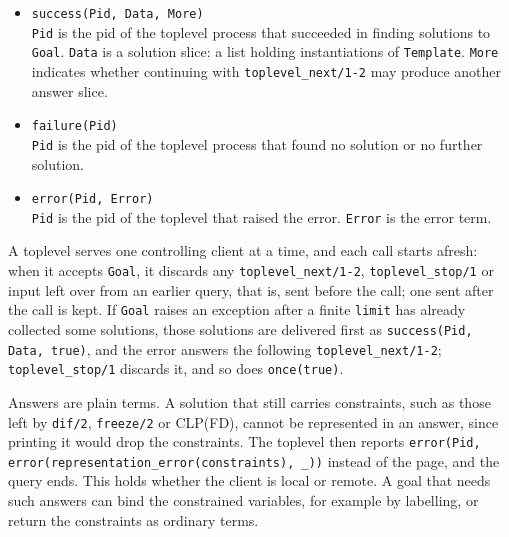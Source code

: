 \begin{itemize}
\item
  \texttt{success(\allowbreak{}Pid,\allowbreak{} Data,\allowbreak{} More)}\\
  \texttt{Pid} is the pid of the toplevel process that succeeded in finding
  solutions to \texttt{Goal}. \texttt{Data} is a solution slice: a list holding
  instantiations of \texttt{Template}. \texttt{More} indicates whether
  continuing with \texttt{toplevel\_\allowbreak{}next/\allowbreak{}1-2} may produce another answer
  slice.
\item
  \texttt{failure(\allowbreak{}Pid)}\\
  \texttt{Pid} is the pid of the toplevel process that found no solution or
  no further solution.
\item
    \texttt{error(\allowbreak{}Pid,\allowbreak{} Error)}\\
  \texttt{Pid} is the pid of the toplevel that raised the error.
  \texttt{Error} is the error term.
\end{itemize}

\noindent A toplevel serves one controlling client at a time, and each call
starts afresh: when it accepts \texttt{Goal}, it discards any
\texttt{toplevel\_\allowbreak{}next/\allowbreak{}1-2}, \texttt{toplevel\_\allowbreak{}stop/\allowbreak{}1} or input left over
from an earlier query, that is, sent before the call; one sent after the call
is kept. If \texttt{Goal} raises an exception after a finite
\texttt{limit} has already collected some solutions, those solutions are
delivered first as \texttt{success(\allowbreak{}Pid,\allowbreak{} Data,\allowbreak{} true)}, and the error answers
the following \texttt{toplevel\_\allowbreak{}next/\allowbreak{}1-2}; \texttt{toplevel\_\allowbreak{}stop/\allowbreak{}1} discards
it, and so does \texttt{once(\allowbreak{}true)}.

Answers are plain terms. A solution that still carries constraints,
such as those left by \texttt{dif/\allowbreak{}2}, \texttt{freeze/\allowbreak{}2} or CLP(FD), cannot be
represented in an answer, since printing it would drop the constraints. The
toplevel then reports
\texttt{error(\allowbreak{}Pid,\allowbreak{} error(\allowbreak{}representation\_\allowbreak{}error(\allowbreak{}constraints),\allowbreak{} \_\allowbreak{}))} instead of
the page, and the query ends. This holds whether the client is local or remote.
A goal that needs such answers can bind the constrained variables, for example
by labelling, or return the constraints as ordinary terms.

